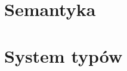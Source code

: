 \documentclass[12pt]{article}
\begin{document}
\section{Semantyka}

\section{System typów}
\end{document}
